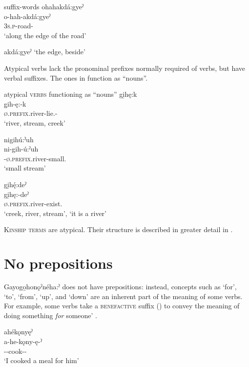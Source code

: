 \ea\label{ex:non.canonical2} suffix-words
\ea ohahakdá:gyeˀ\\\label{ex:non.canonical2a}
\gll o-hah-akdá:gyeˀ\\
 \textsc{3s.p}-road- \\
\glt `along the edge of the road'

\ex akdá:gyeˀ ‘the edge, beside’\label{ex:non.canonical2b}
\z
\z

Atypical verbs lack the pronominal prefixes normally required of verbs, but have verbal suffixes. The ones in  function as “nouns”.

\ea\label{ex:non.canonical4} atypical \textsc{verbs} functioning as “nouns”
\ea gi̱hę:k\\
\gll g̱ih-ę:-k\\
 \textsc{ø.prefix}.river-lie.{\stative}-{\modalizer}\\
\glt `river, stream, creek'

\ex nigihú:ˀuh\\
\gll ni-gih-ú:ˀuh\\
 \exsc{\partitive}-\textsc{ø.prefix.}river-small.{\stative}\\
\glt `small stream'

\ex gi̱hę́:deˀ\\
\gll gi̱hę:-deˀ\\
 \textsc{ø.prefix}.river-exist.{\stative}\\
\glt  ‘creek, river, stream’, `it is a river'
\z
\z

\textsc{Kinship terms} are atypical. Their structure is described in greater detail in .


\section{No prepositions} \label{No prepositions}
Gayogo̱honǫˀnéha:ˀ does not have prepositions: instead, concepts such as ‘for’, ‘to’, ‘from’, ‘up’, and ‘down’ are an inherent part of the meaning of some verbs. For example, some verbs take a \textsc{benefactive} suffix () to convey the meaning of doing something \emph{for} someone’ .

\ea\label{ex:preposex} ahékǫnyęˀ\\
\gll a-he-kǫny-ę-ˀ\\
{\factual}--cook-{\benefactive}-{\punctual}\\
\glt ‘I cooked a meal for him’
\z

